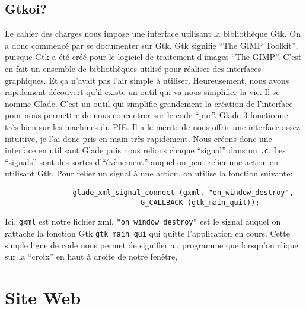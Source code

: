 \documentclass[]{report}
\begin{document}
		\section{Gtkoi?} %
		\label{sec:gtkoi_}
			Le cahier des charges nous impose une interface utilisant la biblioth\`eque Gtk. On a donc commenc\'e par se documenter sur Gtk.
			Gtk signifie ``The GIMP Toolkit'', puisque Gtk a \'et\'e cr\'e\'e pour le logiciel de traitement d'images ``The GIMP''. C'est en fait un ensemble de biblioth\`eques utilis\'e pour r\'ealiser des interfaces graphiques. Et \c ca n'avait pas l'air simple \`a utiliser.
			Heureusement, nous avons rapidement d\'ecouvert qu'il existe un outil qui va nous simplifier la vie. Il se nomme Glade. C'est un outil qui simplifie grandement la cr\'eation de l'interface pour nous permettre de nous concentrer sur le code ``pur''. Glade 3 fonctionne tr\`es bien sur les machines du PIE. Il a le m\'erite de nous offrir une interface assez intuitive, je l'ai donc pris en main tr\`es rapidement.
			Nous cr\'eons donc une interface en utilisant Glade puis nous relions chaque ``signal'' dans un \texttt{.c}. Les ``signals'' sont des sortes d'``\'ev\`enement'' auquel on peut relier une action en utilisant Gtk.
			Pour relier un signal \`a une action, on utilise la fonction suivante:

			\begin{verbatim}
				glade_xml_signal_connect (gxml, "on_window_destroy",
							    G_CALLBACK (gtk_main_quit));
			\end{verbatim}

			Ici, \verb!gxml! est notre fichier xml, \verb!"on_window_destroy"! est le signal auquel on rattache la fonction Gtk \verb!gtk_main_qui! qui quitte l'application en cours. Cette simple ligne de code nous permet de signifier au programme que lorsqu'on clique sur la ``croix'' en haut \`a droite de notre fen\^etre,





	\chapter{Site Web} %
	\label{cha:site_web}
\end{document}
